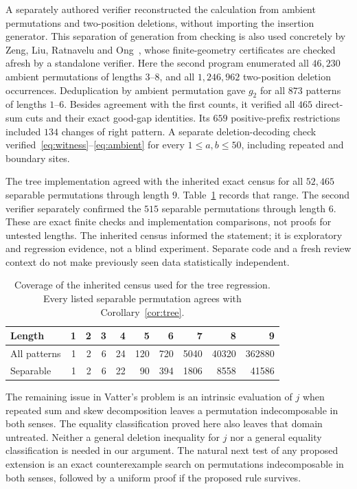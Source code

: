 \documentclass[11pt,a4paper]{article}
\theoremstyle{remark}
\begin{document}
A separately authored verifier reconstructed the calculation from
ambient permutations and two-position deletions, without importing
the insertion generator. This separation of generation from checking
is also used concretely by Zeng, Liu, Ratnavelu and
Ong~\cite[Section~6]{zengcert}, whose finite-geometry certificates are
checked afresh by a standalone verifier. Here the second program
enumerated all $46{,}230$ ambient permutations of lengths $3$--$8$,
and all $1{,}246{,}962$ two-position deletion occurrences. Deduplication
by ambient permutation gave $g_2$ for all $873$ patterns of lengths
$1$--$6$. Besides agreement with the first counts, it verified all
$465$ direct-sum cuts and their exact good-gap identities. Its $659$
positive-prefix restrictions included $134$ changes of right pattern.
A separate deletion-decoding check verified~\eqref{eq:witness}--\eqref{eq:ambient}
for every $1\le a,b\le50$, including repeated and boundary sites.

The tree implementation agreed with the inherited exact census for all
$52{,}465$ separable permutations through length $9$. Table~\ref{tab:coverage}
records that range. The second verifier separately confirmed the $515$
separable permutations through length $6$. These are exact finite
checks and implementation comparisons, not proofs for untested lengths.
The inherited census informed the statement; it is exploratory and
regression evidence, not a blind experiment. Separate code and a fresh
review context do not make previously seen data statistically independent.

\begin{table}[ht]
\centering
\caption{Coverage of the inherited census used for the tree regression.
Every listed separable permutation agrees with Corollary~\ref{cor:tree}.}
\label{tab:coverage}
\small
\begin{tabular}{lrrrrrrrrr}
\toprule
Length & 1 & 2 & 3 & 4 & 5 & 6 & 7 & 8 & 9\\
\midrule
All patterns & 1 & 2 & 6 & 24 & 120 & 720 & 5040 & 40320 & 362880\\
Separable & 1 & 2 & 6 & 22 & 90 & 394 & 1806 & 8558 & 41586\\
\bottomrule
\end{tabular}
\end{table}

The remaining issue in Vatter's problem is an intrinsic evaluation of
$j$ when repeated sum and skew decomposition leaves a permutation
indecomposable in both senses. The equality classification proved here
also leaves that domain untreated. Neither a general deletion inequality
for $j$ nor a general equality classification is needed in our argument.
The natural next test of any proposed extension is an exact counterexample
search on permutations indecomposable in both senses, followed by a
uniform proof if the proposed rule survives.
\end{document}
